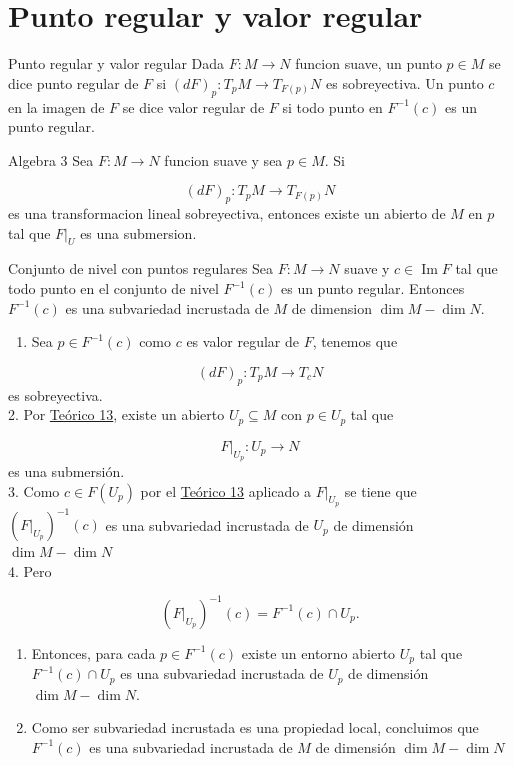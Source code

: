 \section{Punto regular y valor regular}
\begin{bookdefinition}{Punto regular y valor regular}
Dada $F:M\to N$ funcion suave, un punto $p\in M$ se dice punto regular de $F$ si $(dF)_p:T_pM\to T_{F(p)}N$ es sobreyectiva. Un punto $c$ en la imagen de $F$ se dice valor regular de $F$ si todo punto en $F^{-1}(c)$ es un punto regular.

\end{bookdefinition}
\begin{bookexercise}{Algebra 3}
Sea $F:M\to N$ funcion suave y sea $p\in M$. Si

\[
(dF)_p:T_pM\to T_{F(p)}N
\]
es una transformacion lineal sobreyectiva, entonces existe un abierto de $M$ en $p$ tal que $F|_U$ es una submersion.

\end{bookexercise}
\label{blk:1aee60}
\begin{bookcorollary}{Conjunto de nivel con puntos regulares}
Sea $F:M\to N$ suave y $c\in\operatorname{Im}F$ tal que todo punto en el conjunto de nivel $F^{-1}(c)$ es un punto regular. Entonces $F^{-1}(c)$ es una subvariedad incrustada de $M$ de dimension $\dim M-\dim N$.

\end{bookcorollary}
\begin{bookproof}{}
\begin{enumerate}
\item Sea $p\in F^{-1}(c)$ como $c$ es valor regular de $F$, tenemos que
\end{enumerate}
\[
(dF)_p:T_pM\to T_cN
\]
es sobreyectiva.\\
2. Por \hyperref[blk:1aee60]{Teórico 13}, existe un abierto $U_p\subseteq M$ con $p\in U_p$ tal que

\[
F|_{U_p}:U_p\to N
\]
es una submersión.\\
3. Como $c\in F(U_p)$ por el \hyperref[blk:784cb7]{Teórico 13} aplicado a $F|_{U_p}$ se tiene que $(F|_{U_p})^{-1}(c)$ es una subvariedad incrustada de $U_p$ de dimensión $\dim M-\dim N$\\
4. Pero

\[
(F|_{U_p})^{-1}(c)=F^{-1}(c)\cap U_p.
\]
\begin{enumerate}[start=5]
\item Entonces, para cada $p\in F^{-1}(c)$ existe un entorno abierto $U_p$ tal que $F^{-1}(c)\cap U_p$ es una subvariedad incrustada de $U_p$ de dimensión $\dim M-\dim N.$
\item Como ser subvariedad incrustada es una propiedad local, concluimos que $F^{-1}(c)$ es una subvariedad incrustada de $M$ de dimensión $\dim M-\dim N$
\end{enumerate}
\bookqed
\end{bookproof}
